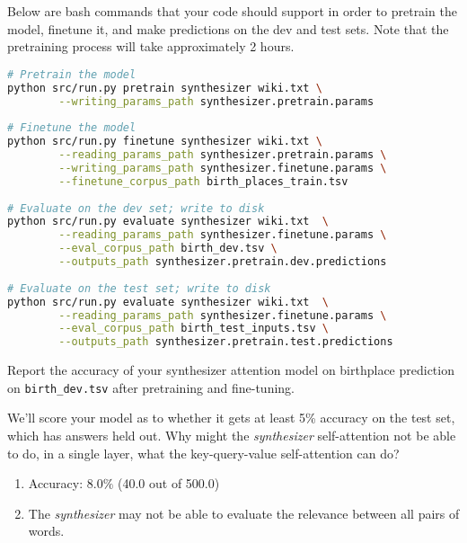 \begin{parts}
    Below are bash commands that your code should support in order to pretrain the model, finetune it, and make predictions on the dev and test sets.
    Note that the pretraining process will take approximately 2 hours.
    \begin{lstlisting}[basicstyle=\ttfamily, language=bash]
# Pretrain the model
python src/run.py pretrain synthesizer wiki.txt \
        --writing_params_path synthesizer.pretrain.params
        
# Finetune the model
python src/run.py finetune synthesizer wiki.txt \
        --reading_params_path synthesizer.pretrain.params \
        --writing_params_path synthesizer.finetune.params \
        --finetune_corpus_path birth_places_train.tsv
        
# Evaluate on the dev set; write to disk
python src/run.py evaluate synthesizer wiki.txt  \
        --reading_params_path synthesizer.finetune.params \
        --eval_corpus_path birth_dev.tsv \
        --outputs_path synthesizer.pretrain.dev.predictions
        
# Evaluate on the test set; write to disk
python src/run.py evaluate synthesizer wiki.txt  \
        --reading_params_path synthesizer.finetune.params \
        --eval_corpus_path birth_test_inputs.tsv \
        --outputs_path synthesizer.pretrain.test.predictions
    \end{lstlisting}

    Report the accuracy of your synthesizer attention model on birthplace prediction on \texttt{birth\_dev.tsv} after pretraining and fine-tuning.

    \begin{subparts}
        \subpart[8]  We'll score your model as to whether it gets at least 5\% accuracy on the test set, which has answers held out.
        \subpart[2] Why might the \textit{synthesizer} self-attention not be able to do, in a single layer, what the key-query-value self-attention can do?

        \begin{answer}
            \begin{enumerate}[label=\roman*.]
                \item Accuracy: $8.0\%$ (40.0 out of 500.0)
                \item The \textit{synthesizer} may not be able to evaluate the relevance between all pairs of words.
            \end{enumerate}
        \end{answer}

    \end{subparts}
\end{parts}

